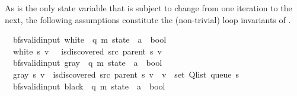 \begin{isabellebody}
\begin{isamarkuptext}
As  is the only state variable that is subject to change from one iteration to the next,
the following assumptions constitute the (non-trivial) loop invariants of .%
\end{isamarkuptext}\isamarkuptrue%
\isamarkupfalse%
\ {\isacharparenleft}{\kern0pt}\ bfs{\isacharunderscore}{\kern0pt}valid{\isacharunderscore}{\kern0pt}input{\isacharparenright}{\kern0pt}\ white\ {\isacharcolon}{\kern0pt}{\isacharcolon}{\kern0pt}\ {\isachardoublequoteopen}{\isacharparenleft}{\kern0pt}{\isacharprime}{\kern0pt}q{\isacharcomma}{\kern0pt}\ {\isacharprime}{\kern0pt}m{\isacharparenright}{\kern0pt}\ state\ {\isasymRightarrow}\ {\isacharprime}{\kern0pt}a\ {\isasymRightarrow}\ bool{\isachardoublequoteclose}\ \isanewline
\ \ {\isachardoublequoteopen}white\ s\ v\ {\isasymequiv}\ {\isasymnot}\ is{\isacharunderscore}{\kern0pt}discovered\ src\ {\isacharparenleft}{\kern0pt}parent\ s{\isacharparenright}{\kern0pt}\ v{\isachardoublequoteclose}\isanewline
\isanewline
{}\isamarkupfalse%
\ {\isacharparenleft}{\kern0pt}\ bfs{\isacharunderscore}{\kern0pt}valid{\isacharunderscore}{\kern0pt}input{\isacharparenright}{\kern0pt}\ gray\ {\isacharcolon}{\kern0pt}{\isacharcolon}{\kern0pt}\ {\isachardoublequoteopen}{\isacharparenleft}{\kern0pt}{\isacharprime}{\kern0pt}q{\isacharcomma}{\kern0pt}\ {\isacharprime}{\kern0pt}m{\isacharparenright}{\kern0pt}\ state\ {\isasymRightarrow}\ {\isacharprime}{\kern0pt}a\ {\isasymRightarrow}\ bool{\isachardoublequoteclose}\ \isanewline
\ \ {\isachardoublequoteopen}gray\ s\ v\ {\isasymequiv}\ is{\isacharunderscore}{\kern0pt}discovered\ src\ {\isacharparenleft}{\kern0pt}parent\ s{\isacharparenright}{\kern0pt}\ v\ {\isasymand}\ v\ {\isasymin}\ set\ {\isacharparenleft}{\kern0pt}Q{\isacharunderscore}{\kern0pt}list\ {\isacharparenleft}{\kern0pt}queue\ s{\isacharparenright}{\kern0pt}{\isacharparenright}{\kern0pt}{\isachardoublequoteclose}\isanewline
\isanewline
{}\isamarkupfalse%
\ {\isacharparenleft}{\kern0pt}\ bfs{\isacharunderscore}{\kern0pt}valid{\isacharunderscore}{\kern0pt}input{\isacharparenright}{\kern0pt}\ black\ {\isacharcolon}{\kern0pt}{\isacharcolon}{\kern0pt}\ {\isachardoublequoteopen}{\isacharparenleft}{\kern0pt}{\isacharprime}{\kern0pt}q{\isacharcomma}{\kern0pt}\ {\isacharprime}{\kern0pt}m{\isacharparenright}{\kern0pt}\ state\ {\isasymRightarrow}\ {\isacharprime}{\kern0pt}a\ {\isasymRightarrow}\ bool{\isachardoublequoteclose}\ \isanewline

\end{isabellebody}

